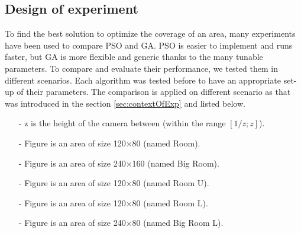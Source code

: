 \subsection{Design of experiment }\label{sec:DoE}


To find the best solution to optimize the coverage of an area, many experiments have been used to compare PSO and GA. PSO is easier to implement and runs faster, but GA is more flexible and generic thanks to the many tunable parameters. 
To compare and evaluate their performance, we tested them in different scenarios. Each algorithm was tested before to have an appropriate set-up of their parameters. 
The comparison is applied on different scenario as that was introduced in the section \ref{sec:contextOfExp} and listed below. 






\begin{itemize}
\item[-]    z is the height of the camera between (within the range $[1/z;z]$).
\item[-]	Figure  is an area of size 120$\times$80 (named Room). 
\item[-]	Figure  is an area of size 240$\times$160 (named Big Room).
\item[-]	Figure  is an area of size 120$\times$80 (named Room U).
\item[-]	Figure  is an area of size 120$\times$80 (named Room L).
\item[-]	Figure  is an area of size 240$\times$80 (named Big Room L).
\end{itemize}


